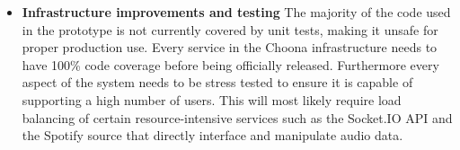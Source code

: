 \begin{itemize}
  \item \textbf{Infrastructure improvements and testing}
    The majority of the code used in the prototype is not currently covered by unit tests, making it unsafe for proper production use. Every service in the Choona infrastructure needs to have 100\% code coverage before being officially released. Furthermore every aspect of the system needs to be stress tested to ensure it is capable of supporting a high number of users. This will most likely require load balancing of certain resource-intensive services such as the Socket.IO API and the Spotify source that directly interface and manipulate audio data.
\end{itemize}